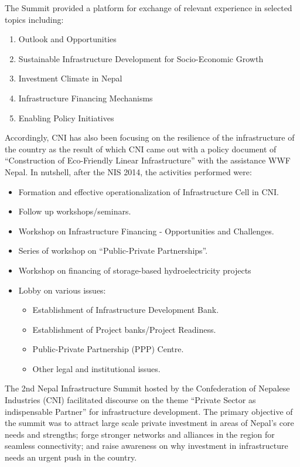 \documentclass[
  openany]{book}
\providecommand{\tightlist}{%
  \setlength{\itemsep}{0pt}\setlength{\parskip}{0pt}}
\begin{document}
The Summit provided a platform for exchange of relevant experience in selected topics including:

\begin{enumerate}
\item Outlook and Opportunities
\item Sustainable Infrastructure Development for Socio-Economic Growth
\item Investment Climate in Nepal
\item Infrastructure Financing Mechanisms
\item Enabling Policy Initiatives
\end{enumerate}

Accordingly, CNI has also been focusing on the resilience of the infrastructure of the country as the result of which CNI came out with a policy document of ``Construction of Eco-Friendly Linear Infrastructure'' with the assistance WWF Nepal. In nutshell, after the NIS 2014, the activities performed were:

\begin{itemize}
\tightlist
\item
  Formation and effective operationalization of Infrastructure Cell in CNI.
\item
  Follow up workshops/seminars.
\item
  Workshop on Infrastructure Financing - Opportunities and Challenges.
\item
  Series of workshop on ``Public-Private Partnerships''.
\item
  Workshop on financing of storage-based hydroelectricity projects
\item
  Lobby on various issues:

  \begin{itemize}
  \tightlist
  \item
    Establishment of Infrastructure Development Bank.
  \item
    Establishment of Project banks/Project Readiness.
  \item
    Public-Private Partnership (PPP) Centre.
  \item
    Other legal and institutional issues.
  \end{itemize}
\end{itemize}

The 2nd Nepal Infrastructure Summit hosted by the Confederation of Nepalese Industries (CNI) facilitated discourse on the theme ``Private Sector as indispensable Partner'' for infrastructure development. The primary objective of the summit was to attract large scale private investment in areas of Nepal's core needs and strengths; forge stronger networks and alliances in the region for seamless connectivity; and raise awareness on why investment in infrastructure needs an urgent push in the country.
\end{document}

